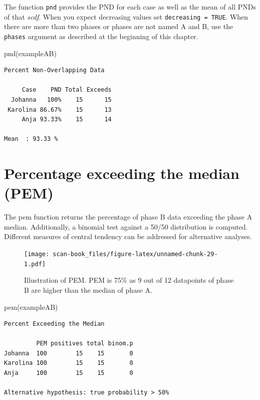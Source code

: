 \documentclass[
]{book}
\newenvironment{Shaded}{\begin{snugshade}}{\end{snugshade}}
\newcommand{\FunctionTok}[1]{\textcolor[rgb]{0.00,0.00,0.00}{#1}}
\newcommand{\NormalTok}[1]{#1}
\begin{document}
The function \texttt{pnd} provides the PND for each case as well as the mean of all PNDs of that \emph{scdf}. When you expect decreasing values set \texttt{decreasing\ =\ TRUE}. When there are more than two phases or phases are not named A and B, use the \texttt{phases} argument as described at the beginning of this chapter.

\begin{Shaded}
\begin{Highlighting}[]
\FunctionTok{pnd}\NormalTok{(exampleAB)}
\end{Highlighting}
\end{Shaded}

\begin{verbatim}
Percent Non-Overlapping Data

     Case    PND Total Exceeds
  Johanna   100%    15      15
 Karolina 86.67%    15      13
     Anja 93.33%    15      14

Mean  : 93.33 %
\end{verbatim}

\hypertarget{percentage-exceeding-the-median-pem}{%
\section{Percentage exceeding the median (PEM)}\label{percentage-exceeding-the-median-pem}}

The pem function returns the percentage of phase B data exceeding the phase A median. Additionally, a binomial test against a 50/50 distribution is computed. Different measures of central tendency can be addressed for alternative analyses.

\begin{figure}
\centering
\texttt{[image: scan-book\_files/figure-latex/unnamed-chunk-29-1.pdf]}
\caption{\label{fig:unnamed-chunk-29}Illustration of PEM. PEM is 75\% as 9 out of 12 datapoints of phase B are higher than the median of phase A.}
\end{figure}

\begin{Shaded}
\begin{Highlighting}[]
\FunctionTok{pem}\NormalTok{(exampleAB)}
\end{Highlighting}
\end{Shaded}

\begin{verbatim}
Percent Exceeding the Median

         PEM positives total binom.p
Johanna  100        15    15       0
Karolina 100        15    15       0
Anja     100        15    15       0

Alternative hypothesis: true probability > 50%
\end{verbatim}
\end{document}
